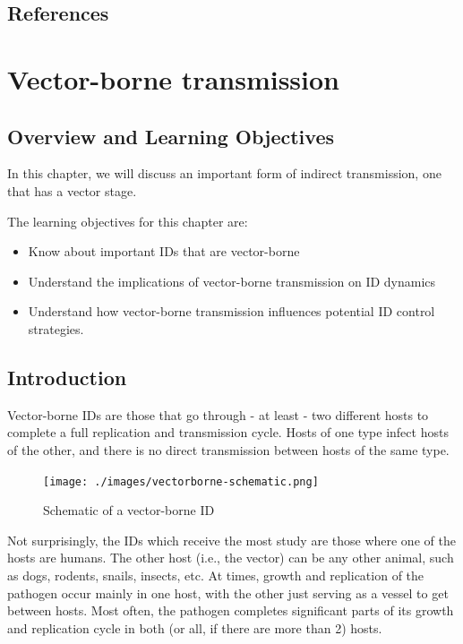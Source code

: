 \documentclass[
]{book}
\providecommand{\tightlist}{%
  \setlength{\itemsep}{0pt}\setlength{\parskip}{0pt}}
\begin{document}
\hypertarget{references-7}{%
\section{References}\label{references-7}}

\hypertarget{vector-borne-transmission-1}{%
\chapter{Vector-borne transmission}\label{vector-borne-transmission-1}}

\hypertarget{overview-and-learning-objectives-7}{%
\section{Overview and Learning Objectives}\label{overview-and-learning-objectives-7}}

In this chapter, we will discuss an important form of indirect transmission, one that has a vector stage.

The learning objectives for this chapter are:

\begin{itemize}
\tightlist
\item
  Know about important IDs that are vector-borne
\item
  Understand the implications of vector-borne transmission on ID dynamics
\item
  Understand how vector-borne transmission influences potential ID control strategies.
\end{itemize}

\hypertarget{introduction-7}{%
\section{Introduction}\label{introduction-7}}

Vector-borne IDs are those that go through - at least - two different hosts to complete a full replication and transmission cycle. Hosts of one type infect hosts of the other, and there is no direct transmission between hosts of the same type.

\begin{figure}
\centering
\texttt{[image: ./images/vectorborne-schematic.png]}
\caption{Schematic of a vector-borne ID}
\end{figure}

Not surprisingly, the IDs which receive the most study are those where one of the hosts are humans. The other host (i.e., the vector) can be any other animal, such as dogs, rodents, snails, insects, etc. At times, growth and replication of the pathogen occur mainly in one host, with the other just serving as a vessel to get between hosts. Most often, the pathogen completes significant parts of its growth and replication cycle in both (or all, if there are more than 2) hosts.
\end{document}
